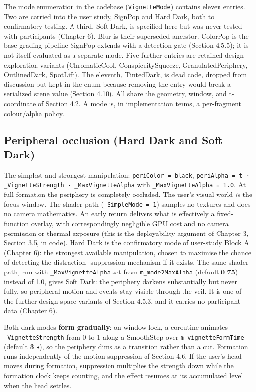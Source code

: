The mode enumeration in the codebase (\verb|VignetteMode|) contains eleven entries. Two are carried
into the user study, SignPop and Hard Dark, both to confirmatory testing. A third, Soft Dark, is
specified here but was never tested with participants (Chapter 6). Blur is their superseded ancestor. ColorPop is the base grading pipeline SignPop extends
with a detection gate (Section 4.5.5); it is not itself evaluated as a separate mode. Five further
entries are retained design-exploration variants (ChromaticCool, ConspicuitySqueeze,
GranulatedPeriphery, OutlinedDark, SpotLift). The eleventh, TintedDark, is dead code, dropped from
discussion but kept in the enum because removing the entry would break a serialized scene value
(Section 4.10). All share the geometry, window, and t-coordinate of Section 4.2. A mode is, in
implementation terms, a per-fragment colour/alpha policy.

\subsection{Peripheral occlusion (Hard Dark and Soft Dark)}

The simplest and strongest manipulation: \verb|periColor = black|,
\verb|periAlpha = t · _VignetteStrength · _MaxVignetteAlpha| with \verb|_MaxVignetteAlpha = 1.0|. At full
formation the periphery is completely occluded. The user's visual world \textit{is} the focus window. The
shader path (\verb|_SimpleMode = 1|) samples no textures and does no camera mathematics. An early return
delivers what is effectively a fixed-function overlay, with correspondingly negligible GPU cost and
no camera permission or thermal exposure (this is the deployability argument of Chapter 3,
Section 3.5, in code). Hard Dark is the confirmatory mode of user-study Block A (Chapter 6): the
strongest available manipulation, chosen to maximise the chance of detecting the distraction-
suppression mechanism if it exists. The same shader path, run with \verb|_MaxVignetteAlpha| set from
\verb|m_mode2MaxAlpha| (default \textbf{0.75}) instead of 1.0, gives Soft Dark: the periphery darkens
substantially but never fully, so peripheral motion and events stay visible through the veil. It is one
of the further design-space variants of Section 4.5.3, and it carries no participant data
(Chapter 6).

Both dark modes \textbf{form gradually}: on window lock, a coroutine animates \verb|_VignetteStrength| from 0
to 1 along a SmoothStep over \verb|m_vignetteFormTime| (default \textbf{3 s}), so the periphery dims as a
transition rather than a cut. Formation runs independently of the motion suppression of Section 4.6.
If the user's head moves during formation, suppression multiplies the strength down while the
formation clock keeps counting, and the effect resumes at its accumulated level when the head
settles.

